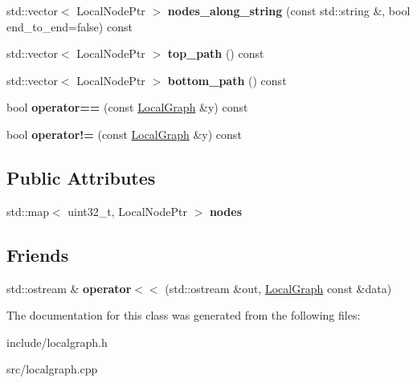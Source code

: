 \begin{DoxyCompactItemize}
std\+::vector$<$ Local\+Node\+Ptr $>$ {\bfseries nodes\+\_\+along\+\_\+string} (const std\+::string \&, bool end\+\_\+to\+\_\+end=false) const
\item 
\mbox{\label{classLocalGraph_affbf0f0c43ca2054d3cafe54abd5fc3a}} 
std\+::vector$<$ Local\+Node\+Ptr $>$ {\bfseries top\+\_\+path} () const
\item 
\mbox{\label{classLocalGraph_aa6f340e9ba3d1e1c5a5f4d8635e3706f}} 
std\+::vector$<$ Local\+Node\+Ptr $>$ {\bfseries bottom\+\_\+path} () const
\item 
\mbox{\label{classLocalGraph_adf78bee0c7af3dcea640d747901866c2}} 
bool {\bfseries operator==} (const \hyperlink{classLocalGraph}{Local\+Graph} \&y) const
\item 
\mbox{\label{classLocalGraph_a9ef745bda5fce51c1879359cf000e7ca}} 
bool {\bfseries operator!=} (const \hyperlink{classLocalGraph}{Local\+Graph} \&y) const
\end{DoxyCompactItemize}
\subsection*{Public Attributes}
\begin{DoxyCompactItemize}
\item 
\mbox{\label{classLocalGraph_afac7b416a2f2b850db3f1c2390129c88}} 
std\+::map$<$ uint32\+\_\+t, Local\+Node\+Ptr $>$ {\bfseries nodes}
\end{DoxyCompactItemize}
\subsection*{Friends}
\begin{DoxyCompactItemize}
\item 
\mbox{\label{classLocalGraph_ada689217eeede954a86a7dde967da3a4}} 
std\+::ostream \& {\bfseries operator$<$$<$} (std\+::ostream \&out, \hyperlink{classLocalGraph}{Local\+Graph} const \&data)
\end{DoxyCompactItemize}


The documentation for this class was generated from the following files\+:\begin{DoxyCompactItemize}
\item 
include/localgraph.\+h\item 
src/localgraph.\+cpp\end{DoxyCompactItemize}
